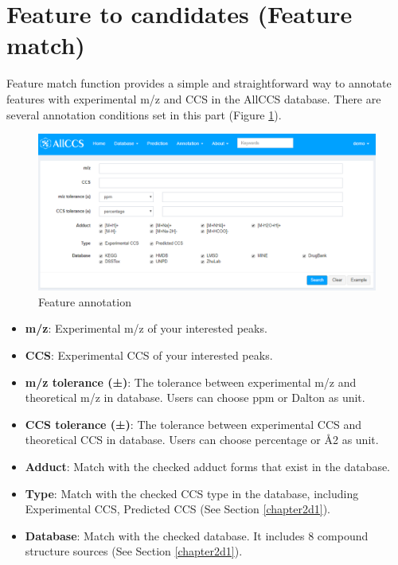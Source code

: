 \documentclass[12pt,]{book}
\providecommand{\tightlist}{%
  \setlength{\itemsep}{0pt}\setlength{\parskip}{0pt}}
\theoremstyle{definition}
\theoremstyle{definition}
\theoremstyle{definition}
\theoremstyle{remark}
\begin{document}
\section{Feature to candidates (Feature match)}\label{chapter4d1}

Feature match function provides a simple and straightforward way to
annotate features with experimental m/z and CCS in the AllCCS database.
There are several annotation conditions set in this part (Figure
\ref{fig:figure4d1}).

\begin{figure}

{\centering \includegraphics{images/chapter4/figure4.1} 

}

\caption{Feature annotation}\label{fig:figure4d1}
\end{figure}

\begin{itemize}
\tightlist
\item
  \textbf{m/z}: Experimental m/z of your interested peaks.
\item
  \textbf{CCS}: Experimental CCS of your interested peaks.
\item
  \textbf{m/z tolerance (±)}: The tolerance between experimental m/z and
  theoretical m/z in database. Users can choose ppm or Dalton as unit.
\item
  \textbf{CCS tolerance (±)}: The tolerance between experimental CCS and
  theoretical CCS in database. Users can choose percentage or Å2 as
  unit.
\item
  \textbf{Adduct}: Match with the checked adduct forms that exist in the
  database.
\item
  \textbf{Type}: Match with the checked CCS type in the database,
  including Experimental CCS, Predicted CCS (See Section
  \ref{chapter2d1}).
\item
  \textbf{Database}: Match with the checked database. It includes 8
  compound structure sources (See Section \ref{chapter2d1}).
\end{itemize}
\end{document}
